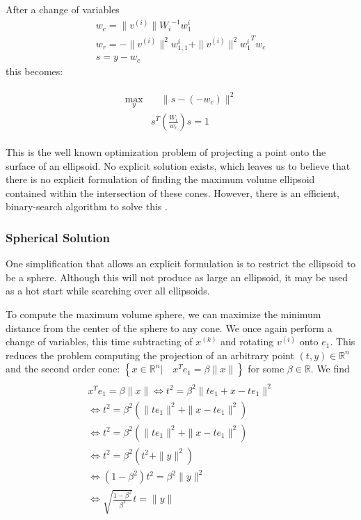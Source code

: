 \documentclass{article}
\theoremstyle{case}
\newcommand{\xk}{{x^{(k)}}}
\newcommand{\Rn}{\mathbb R^n}
\newcommand{\reals}{\mathbb R}
\begin{document}
After a change of variables
\begin{align*}
w_c = \|v^{(i)}\|{W_i}^{-1}w_1^i \\
w_r =  - \|v^{(i)}\|^2{w_{1,1}^i} + \|v^{(i)}\|^2{{w_1^i}}^Tw_c \\
s = y - w_c
\end{align*}
this becomes:

\begin{align}
\label{cone_feasibility_check}
\begin{array}{ccc}
\max_{y} & \quad \|s - \left(-w_c\right)\|^2  \\
 & s^T\left(\frac {W_i}{w_r}\right)s = 1
 \end{array}
\end{align}

This is the well known optimization problem of projecting a point onto the surface of an ellipsoid.
No explicit solution exists, which leaves us to believe that there is no explicit formulation of finding the maximum volume ellipsoid contained within the intersection of these cones.
However, there is an efficient, binary-search algorithm to solve this \cite{projecttoellipsoid}.


\subsubsection{Spherical Solution}

One simplification that allows an explicit formulation is to restrict the ellipsoid to be a sphere.
Although this will not produce as large an ellipsoid, it may be used as a hot start while searching over all ellipsoids.

To compute the maximum volume sphere, we can maximize the minimum distance from the center of the sphere to any cone.
We once again perform a change of variables, this time subtracting of $\xk$ and rotating $v^{(i)}$ onto $e_1$.
This reduces the problem computing the projection of an arbitrary point $(t, y) \in \Rn$ and the second order cone: $\left\{ x \in \mathbb R^n | \quad x^Te_1 = \beta \|x\| \right\}$ for some $\beta \in \reals$.
We find
\begin{align*}
 \\
x^Te_1 = \beta \|x\| 
 \Longleftrightarrow t^2 = \beta^2 \|te_1  + x - t e_1\|^2 \\
 \Longleftrightarrow t^2 = \beta^2 \left(\|te_1\|^2  + \|x - t e_1\|^2\right) \\
 \Longleftrightarrow t^2 = \beta^2 \left(\|te_1\|^2  + \|x - t e_1\|^2\right) \\
 \Longleftrightarrow t^2 = \beta^2 \left(t^2  + \|y\|^2 \right) \\
 \Longleftrightarrow (1 - \beta^2)t^2 = \beta^2 \|y\|^2 \\
 \Longleftrightarrow \sqrt{\frac{1 - \beta^2}{ \beta^2}} t = \|y\|
\end{align*}
\end{document}
